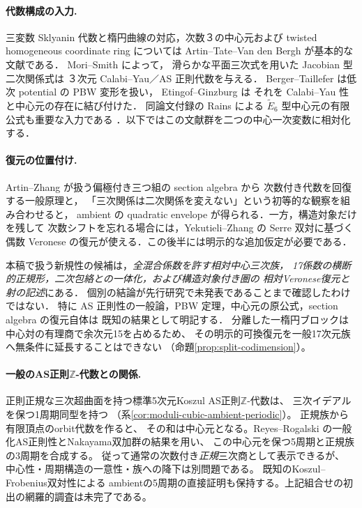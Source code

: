 \documentclass[11pt,a4paper]{ltjsarticle}
\numberwithin{equation}{section}
\begin{document}
\paragraph{代数構成の入力.}
三変数 Sklyanin 代数と楕円曲線の対応，次数３の中心元および
twisted homogeneous coordinate ring については
Artin--Tate--Van den Bergh \cite{ATV} が基本的な文献である．
Mori--Smith \cite[Theorem~4.2(1)]{MS} によって，
滑らかな平面三次式を用いた Jacobian 型二次関係式は
３次元 Calabi--Yau／AS 正則代数を与える．
Berger--Taillefer \cite{BT} は低次 potential の PBW 変形を扱い，
Etingof--Ginzburg \cite[Proposition~7.3.1(ii), Theorem~3.3.2]{EG} は
それを Calabi--Yau 性と中心元の存在に結び付けた．
同論文付録の Rains による $\widetilde E_6$ 型中心元の有限公式も重要な入力である
\cite[\S9.1]{EG}．以下ではこの文献群を二つの中心一次変数に相対化する．

\paragraph{復元の位置付け.}
Artin--Zhang \cite{AZ} が扱う偏極付き三つ組の section algebra から
次数付き代数を回復する一般原理と，
「三次関係は二次関係を変えない」という初等的な観察を組み合わせると，
ambient の quadratic envelope が得られる．一方，構造対象だけを残して
次数シフトを忘れる場合には，Yekutieli--Zhang \cite{YZ} の Serre 双対に基づく
偶数 Veronese の復元が使える．この後半には明示的な追加仮定が必要である．

本稿で扱う新規性の候補は，\emph{全混合係数を許す相対中心三次族，
17係数の横断的正規形，二次包絡との一体化，および構造対象付き圏の
相対Veronese復元と射の記述}にある．
個別の結論が先行研究で未発表であることまで確認したわけではない．
特に AS 正則性の一般論，PBW 定理，中心元の原公式，section algebra の復元自体は
既知の結果として明記する．
分離した一楕円ブロックは中心対の有理商で余次元15を占めるため、
その明示的可換復元を一般17次元族へ無条件に延長することはできない
（命題\ref{prop:split-codimension}）。

\paragraph{一般のAS正則$\mathbb Z$-代数との関係.}
正則正規な三次超曲面を持つ標準5次元Koszul AS正則$\mathbb Z$-代数は、
三次イデアルを保つ1周期同型を持つ
（系\ref{cor:moduli-cubic-ambient-periodic}）。
正規族\cite{PChanNymanNormalFamily}から有限頂点のorbit代数を作ると、
その和は中心元となる。Reyes--Rogalski\cite[Theorem~5.15, Lemmas~5.9 and~4.5]{RRGeneralizedAS}
の一般化AS正則性とNakayama双加群の結果を用い、
この中心元を保つ5周期と正規族の3周期を合成する。
従って通常の次数付き\emph{正規}三次商として表示できるが、
中心性・周期構造の一意性・族への降下は別問題である。
既知のKoszul--Frobenius双対性\cite{PBondalPolishchukHelices}による
ambientの5周期の直接証明も保持する。上記組合せの初出の網羅的調査は未完了である。
\end{document}
